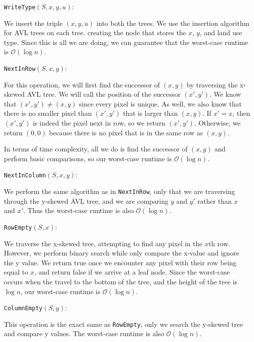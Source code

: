 \documentclass{assignment-263}
\begin{document}
\texttt{WriteType}\((S,x,y, u)\): 

We insert the triple \((x,y,u)\) into both the trees. We use the insertion algorithm for AVL trees on each tree. creating the node that stores the \(x\), \(y\), and land use type. Since this is all we are doing, we can guarantee that the worst-case runtime is \(\mathcal{O}(\log n)\).

\texttt{NextInRow}\((S,x,y)\):

For this operation, we will first find the successor of \((x,y)\) by traversing the x-skewed AVL tree. We will call the position of the successor \((x',y')\). We know that \((x',y') \neq (x,y)\) since every pixel is unique. As well, we also know that there is no smaller pixel than \((x',y')\) that is larger than \((x,y)\). If \(x' = x\), then \((x',y')\) is indeed the pixel next in row, so we return \((x',y')\). Otherwise, we return \((0,0)\) because there is no pixel that is in the same row as \((x,y)\).

In terms of time complexity, all we do is find the successor of \((x,y)\) and perform basic comparisons, so our worst-case runtime is \(\mathcal{O} (\log n)\).

\texttt{NextInColumn}\((S,x,y)\): 

We perform the same algorithm as in \texttt{NextInRow}, only that we are traversing through the y-skewed AVL tree, and we are comparing \(y\) and \(y'\) rather than \(x\) and \(x'\). Thus the worst-case runtime is also \(\mathcal{O} (\log n)\).

\texttt{RowEmpty}\((S,x)\): 

We traverse the x-skewed tree, attempting to find any pixel in the \(x\)th row. However, we perform binary search while only compare the x-value and ignore the y value. We return true once we encounter any pixel with their row being equal to \(x\), and return false if we arrive at a leaf node. Since the worst-case occurs when the travel to the bottom of the tree, and the height of the tree is \(\log n\), our worst-case runtime is \(\mathcal{O} (\log n)\).

\texttt{ColumnEmpty}\((S,y)\): 

This operation is the exact same as \texttt{RowEmpty}, only we search the y-skewed tree and compare y values. The worst-case runtime is also \(\mathcal{O} (\log n)\).

\program
\end{document}
